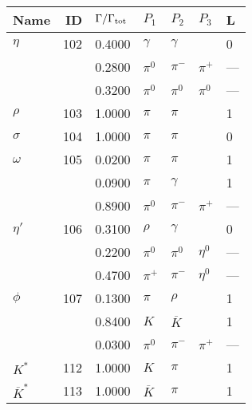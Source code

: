 \documentclass[a4paper,10pt]{article}
\begin{document}
\begin{tabular} {|lr|l|lll|l|} 
\hline
Name & ID & $\Gamma/\Gamma_{\rm tot}$ & $P_1$ & $P_2$ & $P_3$ & L \\ 
\hline
$      \eta          $&102&  0.4000&$ \gamma              $&$ \gamma              $&$                     $& 0\\
$                    $&   &  0.2800&$ \pi^0               $&$ \pi^-               $&$ \pi^+               $& ---\\
$                    $&   &  0.3200&$ \pi^0               $&$ \pi^0               $&$ \pi^0               $& ---\\
\hline
$      \rho          $&103&  1.0000&$ \pi                 $&$ \pi                 $&$                     $& 1\\
\hline
$      \sigma        $&104&  1.0000&$ \pi                 $&$ \pi                 $&$                     $& 0\\
\hline
$      \omega        $&105&  0.0200&$ \pi                 $&$ \pi                 $&$                     $& 1\\
$                    $&   &  0.0900&$ \pi                 $&$ \gamma              $&$                     $& 1\\
$                    $&   &  0.8900&$ \pi^0               $&$ \pi^-               $&$ \pi^+               $& ---\\
\hline
$      \eta'         $&106&  0.3100&$ \rho                $&$ \gamma              $&$                     $& 0\\
$                    $&   &  0.2200&$ \pi^0               $&$ \pi^0               $&$ \eta^0              $& ---\\
$                    $&   &  0.4700&$ \pi^+               $&$ \pi^-               $&$ \eta^0              $& ---\\
\hline
$      \phi          $&107&  0.1300&$ \pi                 $&$ \rho                $&$                     $& 1\\
$                    $&   &  0.8400&$ K                   $&$ \overline{K}        $&$                     $& 1\\
$                    $&   &  0.0300&$ \pi^0               $&$ \pi^-               $&$ \pi^+               $& ---\\
\hline
$      K^*           $&112&  1.0000&$ K                   $&$ \pi                 $&$                     $& 1\\
\hline
$      \overline{K}^*$&113&  1.0000&$ \overline{K}        $&$ \pi                 $&$                     $& 1\\

\end{tabular}
\end{document}
